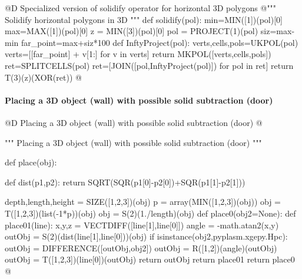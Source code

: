 \documentclass[11pt,oneside]{article}    %
\begin{document}
@D Specialized version of solidify operator for horizontal 3D polygons
@{""" Solidify horizontal polygons in 3D """
def solidify(pol):    
    min=MIN([1])(pol)[0]
    max=MAX([1])(pol)[0]
    z = MIN([3])(pol)[0]
    pol = PROJECT(1)(pol)
    siz=max-min
    far_point=max+siz*100 
    def InftyProject(pol):
        verts,cells,pols=UKPOL(pol)
        verts=[[far_point] + v[1:] for v in verts]
        return MKPOL([verts,cells,pols])  
    ret=SPLITCELLS(pol)
    ret=[JOIN([pol,InftyProject(pol)]) for pol in ret]
    return T(3)(z)(XOR(ret))
@}

\paragraph{Placing a 3D object (wall) with possible solid subtraction (door)}
@D Placing a 3D object (wall) with possible solid subtraction (door)
@{""" Placing a 3D object (wall) with possible solid subtraction (door) """

def place(obj):

    def dist(p1,p2):
        return SQRT(SQR(p1[0]-p2[0])+SQR(p1[1]-p2[1]))

    depth,length,height = SIZE([1,2,3])(obj)
    p = array(MIN([1,2,3])(obj))
    obj = T([1,2,3])(list(-1*p))(obj)
    obj = S(2)(1./length)(obj)
    def place0(obj2=None):
        def place01(line):
            x,y,z = VECTDIFF([line[1],line[0]])
            angle = -math.atan2(x,y)
            outObj = S(2)(dist(line[1],line[0]))(obj)
            if isinstance(obj2,pyplasm.xgepy.Hpc):
                outObj = DIFFERENCE([outObj,obj2])
            outObj = R([1,2])(angle)(outObj)
            outObj = T([1,2,3])(line[0])(outObj)
            return outObj
        return place01
    return place0
@}
\end{document}
